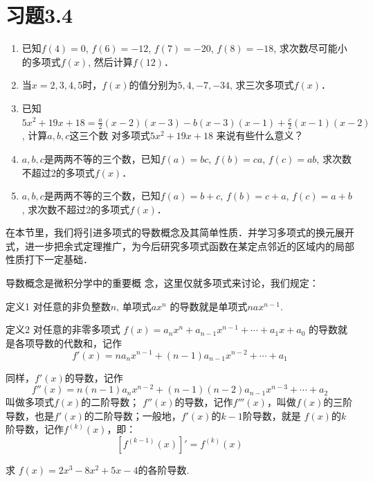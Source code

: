     \section*{习题3.4}
    \begin{enumerate}
        \item 已知$f(4)=0$, $f(6)=-12$, $f(7)=-20$,
        $f(8)=-18$, 求次数尽可能小的多项式$f(x)$, 然后计算$f(12)$．
        \item 当$x=2, 3, 4, 5$时，$f(x)$的值分别为$5, 4,-7,-34$, 求三次多项式$f(x)$．
        \item 已知$5x^2+19x+18=\frac{a}{2}(x-2)(x-3)-b(x-3)(x-1)+\frac{c}{2}(x-1)(x-2)$, 计算$a,b,c$这三个数
        对多项式$5x^2+19x+18$ 来说有些什么意义？
        \item $a,b,c$是两两不等的三个数，已知$f(a)=bc$, $f(b)=
        ca$, $f(c)=ab$, 求次数不超过2的多项式$f(x)$．
        \item $a,b,c$是两两不等的三个数，已知$f(a)=b+c$, $f(b)=
        c+a$, $f(c)=a+b$, 求次数不超过2的多项式$f(x)$．
    \end{enumerate}
    
    在本节里，我们将引进多项式的导数概念及其简单性质．并学习多项式的换元展开式，进一步把余式定理推广，为今后研究多项式函数在某定点邻近的区域内的局部性质打下一定基础．
    
    导数概念是微积分学中的重要概
    念，这里仅就多项式来讨论，我们规定：
    
\begin{blk}{定义1}
对任意的非负整数$n$, 单项式$ax^n$
的导数就是单项式$nax^{n-1}$.
\end{blk}    

     
\begin{blk}{定义2}
对任意的非零多项式
$f (x) =a_nx^n+a_{n-1}x^{n-1}+\cdots+a_1x+a_0$
的导数就是各项导数的代数和，记作
\[f' (x) =na_nx^{n-1}+(n-1)a_{n-1}x^{n-2}+\cdots +a_1\]

同样，$f'(x)$的导数，记作
\[f'' (x) =n (n-1) a_nx^{n-2} + (n-1) (n-2)a_{n-1}x^{n-3}+\cdots+a_2\]
叫做多项式$f(x)$的二阶导数；
$f''(x)$的导数，记作$f'''(x)$，叫做$f(x)$的三阶导数，也是$f'(x)$的二阶导数；一般地，$f'(x)$的$k-1$阶导数，就是
$f(x)$的$k$阶导数，记作$f^{(k)}(x)$，即：
\[\left[f^{(k-1)} (x)\right]'=f^{(k)}(x)\]
\end{blk}    

   \begin{example}
    求 $f(x)=2x^3-8x^2+5x-4$的各阶导数.
    \end{example}

